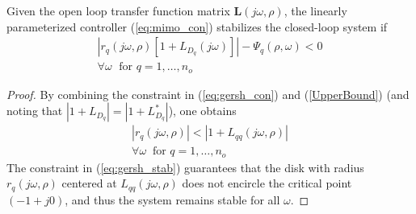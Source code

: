 \documentclass[A4, 10pt, conference]{ieeeconf}
\newcommand{\jo}{(j\omega,\rho)}
\renewcommand{\vec}[1]{\mathbf{#1}}
\begin{document}
\begin{theorem} 
\label{rob_stab}
Given the open loop transfer function matrix $\vec{L}\jo$, the linearly parameterized controller (\ref{eq:mimo_con}) stabilizes the closed-loop system if
\begin{eqnarray} \label{eq:gersh_con}
|r_{q}(j\omega,\rho)[1+L_{D_{q}}(j\omega)]|-\Psi_{q}(\rho,\omega)<0 \nonumber\\
\forall \omega \; \mbox{ for }q=1,\ldots,n_o
\end{eqnarray}
\end{theorem}
\begin{proof} 
By combining the constraint in (\ref{eq:gersh_con}) and (\ref{UpperBound}) (and noting that $|1+L_{D_{q}}|=|1+L^*_{D_{q}}|$), one obtains 				
\begin{eqnarray} \label{eq:gersh_stab}
|r_{q}\jo | < |1+L_{qq}\jo | \nonumber\\
 \forall \omega \: \mbox{ for }q=1,\ldots,n_o
\end{eqnarray}
The constraint in (\ref{eq:gersh_stab}) guarantees that the disk with radius $r_q\jo$ centered at $L_{qq}\jo$ does not encircle the critical point $(-1+j0)$, and thus the system remains stable for all $\omega$.%
\end{proof}
\end{document}

